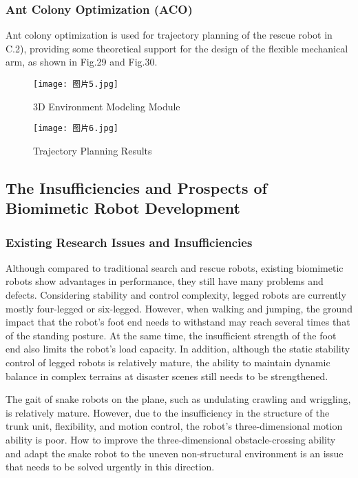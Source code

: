 \documentclass[conference]{IEEEtran}
\begin{document}
\subsubsection{Ant Colony Optimization (ACO)}
Ant colony optimization is used for trajectory planning of the rescue robot in C.2)\cite{b37}, providing some theoretical support for the design of the flexible mechanical arm, as shown in Fig.29 and Fig.30.
\begin{figure}[h]
    \centering
    \texttt{[image: 图片5.jpg]}
    \caption{3D Environment Modeling Module}
    \label{fig:enter-label}
\end{figure}
\begin{figure}[h]
    \centering
    \texttt{[image: 图片6.jpg]}
    \caption{Trajectory Planning Results}
    \label{fig:enter-label}
\end{figure}

\subsection{The Insufficiencies and Prospects of Biomimetic Robot Development}
\subsubsection{Existing Research Issues and Insufficiencies}
Although compared to traditional search and rescue robots, existing biomimetic robots show advantages in performance, they still have many problems and defects. Considering stability and control complexity, legged robots are currently mostly four-legged or six-legged. However, when walking and jumping, the ground impact that the robot's foot end needs to withstand may reach several times that of the standing posture\cite{b50}. At the same time, the insufficient strength of the foot end also limits the robot's load capacity. In addition, although the static stability control of legged robots is relatively mature, the ability to maintain dynamic balance in complex terrains at disaster scenes still needs to be strengthened.

The gait of snake robots on the plane, such as undulating crawling and wriggling, is relatively mature. However, due to the insufficiency in the structure of the trunk unit, flexibility, and motion control\cite{b51}, the robot's three-dimensional motion ability is poor. How to improve the three-dimensional obstacle-crossing ability and adapt the snake robot to the uneven non-structural environment is an issue that needs to be solved urgently in this direction.
\end{document}
